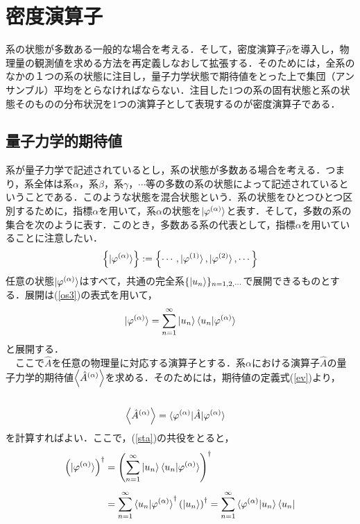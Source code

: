 \documentclass[12pt]{jsarticle}\usepackage{ifthen}\newboolean{enlarge}\setboolean{enlarge}{false}
\begin{document}
\section{密度演算子}
系の状態が多数ある一般的な場合を考える．そして，密度演算子$\hat{\rho}$を導入し，物理量の観測値を求める方法を再定義しなおして拡張する．そのためには，全系のなかの１つの系の状態に注目し，量子力学状態で期待値をとった上で集団（アンサンブル）平均をとらなければならない．注目した1つの系の固有状態と系の状態そのものの分布状況を1つの演算子として表現するのが密度演算子である．
\subsection{量子力学的期待値}
系が量子力学で記述されているとし，系の状態が多数ある場合を考える．つまり，系全体は系$\alpha$，系$\beta$，系$\gamma$，$\cdots$等の多数の系の状態によって記述されているということである．このような状態を混合状態という．系の状態をひとつひとつ区別するために，指標$\alpha$を用いて，系$\alpha$の状態を$\ket{\varphi^{(\alpha)}}$と表す．そして，多数の系の集合を次のように表す．このとき，多数ある系の代表として，指標$\alpha$を用いていることに注意したい．
　\begin{align}
\left\{
\ket{\varphi^{(\alpha)}}
\right\}
:=
\left\{
\cdots,\ket{\varphi^{(1)}},\ket{\varphi^{(2)}},\cdots
\right\}
\end{align}
任意の状態$\ket{\varphi^{(\alpha)}}$はすべて，共通の完全系$\{\ket{u_n}\}_{n=1,2,\cdots}$で展開できるものとする．展開は(\ref{os3})の表式を用いて，
　\begin{align}
\label{sta}
\ket{\varphi^{(\alpha)}}=\displaystyle\sum_{n=1}^\infty\ket{u_n}\braket{u_n|\varphi^{(\alpha)}}
\end{align}
と展開する．\\
　ここで$\hat{A}$を任意の物理量に対応する演算子とする．系$\alpha$における演算子$\hat{A}$の量子力学的期待値$\Braket{\hat{A}^{(\alpha)}}$を求める．そのためには，期待値の定義式(\ref{ev})より，
　　\begin{align}\label{Ea1}
\Braket{\hat{A}^{(\alpha)}}&=\braket{\varphi^{(\alpha)}|\hat{A}|\varphi^{(\alpha)}}
  \end{align}
を計算すればよい．ここで，(\ref{sta})の共役をとると，
　\begin{align}
\label{stabra}
\left(
\ket{\varphi^{(\alpha)}}
\right)^\dag
&=
\left(
\displaystyle\sum_{n=1}^\infty\ket{u_n}\braket{u_n|\varphi^{(\alpha)}}
\right)^\dag\notag\\[5pt]
&=
\displaystyle\sum_{n=1}^\infty
\braket{u_n|\varphi^{(\alpha)}}^\dag
\left(
\ket{u_n}
\right)^\dag
=
\displaystyle\sum_{n=1}^\infty
\braket{\varphi^{(\alpha)}|u_n}
\bra{u_n}
\end{align}
\end{document}
